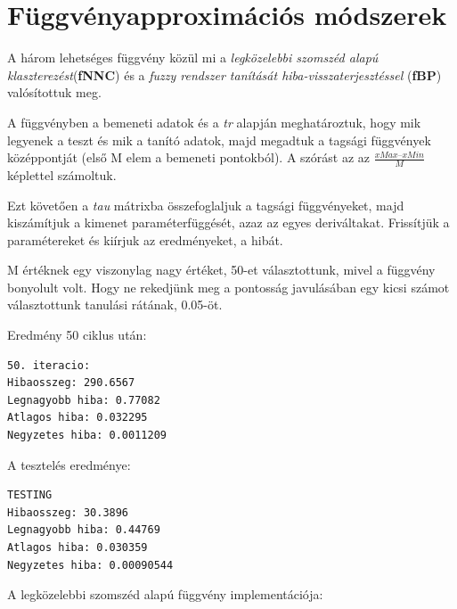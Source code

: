 \section{Függvényapproximációs módszerek}

A három lehetséges függvény közül mi a \textit{legközelebbi szomszéd alapú klaszterezést}(\textbf{fNNC}) és a \textit{fuzzy rendszer tanítását hiba-visszaterjesztéssel} (\textbf{fBP}) valósítottuk meg. 

A függvényben a bemeneti adatok és a \textit{tr} alapján meghatároztuk, hogy mik legyenek a teszt és mik a tanító adatok, majd megadtuk a tagsági függvények középpontját (első M elem a bemeneti pontokból). A szórást az az $ \frac{xMax–xMin}{M} $ képlettel számoltuk.
\label{Matlab2}

Ezt követően a \textit{tau} mátrixba összefoglaljuk a tagsági függvényeket, majd kiszámítjuk a kimenet paraméterfüggését, azaz az egyes deriváltakat. Frissítjük a paramétereket és kiírjuk az eredményeket, a hibát. 
\label{Matlab3}

\newpage
M értéknek egy viszonylag nagy értéket, 50-et választottunk, mivel a függvény bonyolult volt. Hogy ne rekedjünk meg a pontosság javulásában egy kicsi számot választottunk tanulási rátának, 0.05-öt.

Eredmény 50 ciklus után:
\begin{lstlisting}[frame=single]
50. iteracio:
Hibaosszeg: 290.6567
Legnagyobb hiba: 0.77082
Atlagos hiba: 0.032295
Negyzetes hiba: 0.0011209
\end{lstlisting}

A tesztelés eredménye:
\begin{lstlisting}[frame=single]
TESTING
Hibaosszeg: 30.3896
Legnagyobb hiba: 0.44769
Atlagos hiba: 0.030359
Negyzetes hiba: 0.00090544
\end{lstlisting}

A legközelebbi szomszéd alapú függvény implementációja:
\label{Matlab4}


























